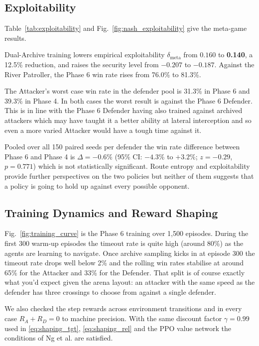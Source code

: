 \documentclass[conference]{IEEEtran}
\begin{document}
\subsection{Exploitability}
Table~\ref{tab:exploitability} and Fig.~\ref{fig:nash_exploitability} give the meta-game results.

Dual-Archive training lowers empirical exploitability $\delta_{\text{meta}}$ from $0.160$ to \textbf{0.140}, a 12.5\% reduction, and raises the security level from $-0.207$ to \textbf{$-0.187$}. Against the River Patroller, the Phase 6 win rate rises from 76.0\% to 81.3\%.

The Attacker's worst case win rate in the defender pool is 31.3\% in Phase 6 and 39.3\% in Phase 4. In both cases the worst result is against the Phase 6 Defender. This is in line with the Phase 6 Defender having also trained against archived attackers which may have taught it a better ability at lateral interception and so even a more varied Attacker would have a tough time against it.

Pooled over all 150 paired seeds per defender the win rate difference between Phase 6 and Phase 4 is $\Delta = -0.6\%$ (95\% CI: $-4.3\%$ to $+3.2\%$; $z = -0.29$, $p = 0.771$) which is not statistically significant. Route entropy and exploitability provide further perspectives on the two policies but neither of them suggests that a policy is going to hold up against every possible opponent.

\subsection{Training Dynamics and Reward Shaping}
Fig.~\ref{fig:training_curve} is the Phase 6 training over 1,500 episodes. During the first 300 warm-up episodes the timeout rate is quite high (around 80\%) as the agents are learning to navigate. Once archive sampling kicks in at episode 300 the timeout rate drops well below 2\% and the rolling win rates stabilise at around 65\% for the Attacker and 33\% for the Defender. That split is of course exactly what you'd expect given the arena layout: an attacker with the same speed as the defender has three crossings to choose from against a single defender.

We also checked the step rewards across environment transitions and in every case $R_A + R_D = 0$ to machine precision. With the same discount factor $\gamma = 0.99$ used in \eqref{eq:shaping_tgt}, \eqref{eq:shaping_rel} and the PPO value network the conditions of Ng et al. \cite{ng1999policy} are satisfied.
\end{document}
